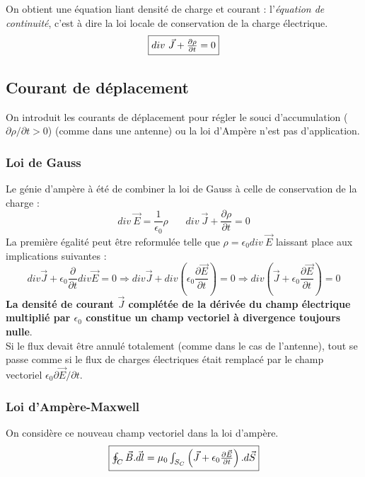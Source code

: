 \documentclass	[11pt, a4paper, openany]{book}
\begin{document}
	On obtient une équation liant densité de charge et courant : l'\textit{équation de continuité}, c'est à dire la loi locale de conservation de la charge électrique.
	\begin{equation}
		\fbox{$div\ \vec{J} + \frac{\partial \rho}{\partial t} = 0 $}
	\end{equation}
	
	\subsection{Courant de déplacement}
	On introduit les courants de déplacement pour régler le souci d'accumulation ($\partial\rho /  \partial t > 0$) (comme dans une antenne) ou la loi d'Ampère n'est pas d'application.
	
	\subsubsection{Loi de Gauss}
	Le génie d'ampère à été de combiner la loi de Gauss à celle de conservation de la charge : 
	\begin{equation}
		div\ \vec{E} = \frac{1}{\epsilon_0}\rho\ \ \ \ \ \ \ \ div\ \vec{J} + \frac{\partial \rho}{\partial t} = 0
	\end{equation}
	La première égalité peut être reformulée telle que $\rho = \epsilon_0div\ \vec{E}$ laissant place aux implications suivantes :
	\begin{equation}
		div\vec{J} + \epsilon_0 \frac{\partial}{\partial t}div\vec{E} = 0 \Rightarrow div\vec{J} + div\left(\epsilon_0\frac{\partial\vec{E}}{\partial t}\right) = 0 \Rightarrow div\left(\vec{J} + \epsilon_0\frac{\partial\vec{E}}{\partial t}\right) = 0
	\end{equation}
	\textbf{La densité de courant $\vec{J}$ complétée de la dérivée du champ électrique multiplié par $\epsilon_0$ constitue un champ vectoriel à divergence toujours nulle}.\\
	
	Si le flux devait être annulé totalement (comme dans le cas de l'antenne), tout se passe comme si le flux de charges électriques était remplacé par le champ vectoriel $\epsilon_0 \partial\vec{E}/\partial t$.
	
	\subsubsection{Loi d'Ampère-Maxwell}
	On considère ce nouveau champ vectoriel dans la loi d'ampère.
	\begin{equation}
		\fbox{$ \oint_C \vec{B}.\vec{dl} = \mu_0   \int_{S_C}\left(\vec{J} + \epsilon_0 \frac{\partial \vec{E}}{\partial t}\right).d\vec{S}$}
	\end{equation}
	
\end{document}
